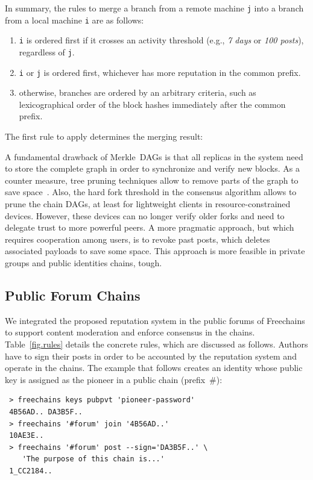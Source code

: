 \documentclass[10pt,journal,compsoc]{IEEEtran}
\newcommand{\FC}       {Freechains\xspace}
\newcommand{\code}[1]  {\texttt{\footnotesize{#1}}}
\begin{document}
In summary, the rules to merge a branch from a remote machine \code{j} into a
branch from a local machine \code{i} are as follows:
\begin{enumerate}
    \item \code{i} is ordered first if it crosses an activity threshold (e.g.,
          \emph{7 days} or \emph{100 posts}), regardless of \code{j}.
    \item \code{i} or \code{j} is ordered first, whichever has more reputation
          in the common prefix.
    \item otherwise, branches are ordered by an arbitrary criteria, such as
          lexicographical order of the block hashes immediately after the
          common prefix.
\end{enumerate}
The first rule to apply determines the merging result:

A fundamental drawback of Merkle~DAGs is that all replicas in the system need
to store the complete graph in order to synchronize and verify new blocks.
As a counter measure, tree pruning techniques allow to remove parts of the
graph to save space~\cite{p2p.prune}.
Also, the hard fork threshold in the consensus algorithm allows to prune the
chain DAGs, at least for lightweight clients in resource-constrained devices.
However, these devices can no longer verify older forks and need to delegate
trust to more powerful peers.
%
A more pragmatic approach, but which requires cooperation among users, is to
revoke past posts, which deletes associated payloads to save some space.
This approach is more feasible in private groups and public identities chains,
tough.

\subsection{Public Forum Chains}
\label{sec.consensus.chains}

We integrated the proposed reputation system in the public forums of \FC to
support content moderation and enforce consensus in the chains.
Table~\ref{fig.rules} details the concrete rules, which are discussed as
follows.
Authors have to sign their posts in order to be accounted by the reputation
system and operate in the chains.
The example that follows creates an identity whose public key is assigned as
the pioneer in a public chain (prefix~$\#$):

{\footnotesize
\begin{verbatim}
 > freechains keys pubpvt 'pioneer-password'
 4B56AD.. DA3B5F..
 > freechains '#forum' join '4B56AD..'
 10AE3E..
 > freechains '#forum' post --sign='DA3B5F..' \
    'The purpose of this chain is...'
 1_CC2184..
\end{verbatim}
}
\end{document}
